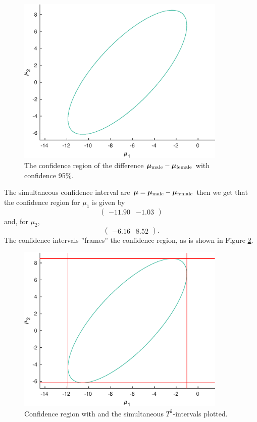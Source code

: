 \message{ !name(examination.tex)}\documentclass[one column]{report}
\renewcommand{\b}[1]{\bm{#1}}
\begin{document}
\begin{figure}[h]
  \centering
  \includegraphics[width=10cm]{ex2fig}
  \caption{The confidence region of the difference
    $\b \mu_{\rm male} - \b \mu_{\rm female}$ with confidence 95\%. }
  \label{fig:ex2fig}
\end{figure}
The simultaneous confidence interval are $\b \mu = \b \mu_{\rm male}- \b
\mu_{\rm female}$ then we get that the confidence region for $\mu_{1}$
is given by 
\begin{equation*}
  \begin{pmatrix}
   -11.90 &-1.03  
  \end{pmatrix}
\end{equation*}
and, for $\mu_{2}$, 
\begin{equation*}
  \begin{pmatrix}
   -6.16 &8.52  
  \end{pmatrix}.
\end{equation*}
The confidence intervals ''frames'' the confidence region, as is shown
in Figure \ref{fig:ex2_sim_intervals}. 
\begin{figure}[h]
  \centering
  \includegraphics[width=10cm]{ex2fig_with_sim_intervals}
  \caption{Confidence region with and the simultaneous $T^{2}$-intervals plotted. }
  \label{fig:ex2_sim_intervals}
\end{figure}
\end{document}
